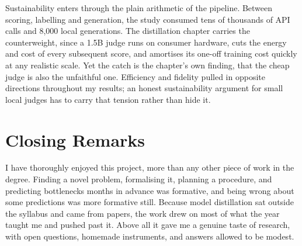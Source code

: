 \documentclass[11pt,a4paper]{article}
\begin{document}
Sustainability enters through the plain arithmetic of the pipeline. Between scoring, labelling and generation, the study consumed tens of thousands of API calls and 8,000 local generations. The distillation chapter carries the counterweight, since a 1.5B judge runs on consumer hardware, cuts the energy and cost of every subsequent score, and amortises its one-off training cost quickly at any realistic scale. Yet the catch is the chapter's own finding, that the cheap judge is also the unfaithful one. Efficiency and fidelity pulled in opposite directions throughout my results; an honest sustainability argument for small local judges has to carry that tension rather than hide it.

\section*{Closing Remarks}

I have thoroughly enjoyed this project, more than any other piece of work in the degree. Finding a novel problem, formalising it, planning a procedure, and predicting bottlenecks months in advance was formative, and being wrong about some predictions was more formative still. Because model distillation sat outside the syllabus and came from papers, the work drew on most of what the year taught me and pushed past it. Above all it gave me a genuine taste of research, with open questions, homemade instruments, and answers allowed to be modest.
\end{document}
